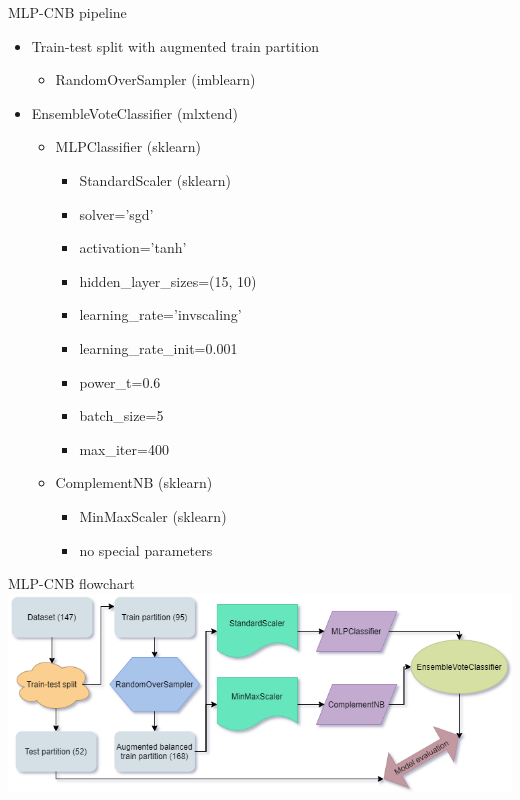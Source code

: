 \documentclass[hyperref={bookmarks=false}]{beamer}
\begin{document}
\begin{frame}{MLP-CNB pipeline}
\begin{itemize}
    \item Train-test split with augmented train partition
    \begin{itemize}
        \item RandomOverSampler (imblearn)
    \end{itemize}
    
    \item EnsembleVoteClassifier (mlxtend)
    \begin{itemize}
        \item MLPClassifier (sklearn)
        \begin{itemize}
            \item StandardScaler (sklearn)
            \item solver='sgd'
            \item activation='tanh'
            \item hidden\_layer\_sizes=(15, 10)
            \item learning\_rate='invscaling'
            \item learning\_rate\_init=0.001
            \item power\_t=0.6
            \item batch\_size=5
            \item max\_iter=400
        \end{itemize}
        
        \item ComplementNB (sklearn)
        \begin{itemize}
            \item MinMaxScaler (sklearn)
            \item no special parameters
        \end{itemize}
    \end{itemize}
\end{itemize}
\end{frame}

\begin{frame}{MLP-CNB flowchart}
\includegraphics[width=\textwidth]{../slike/flowchart.png}
\end{frame}
\end{document}
